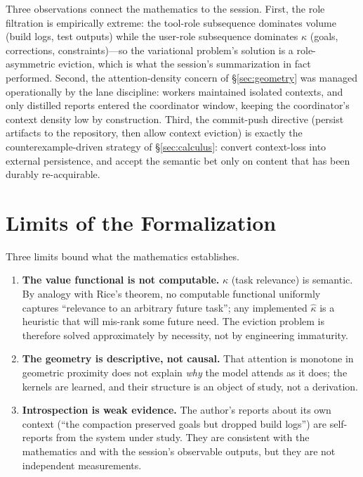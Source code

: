 \documentclass[11pt]{article}
\begin{document}
Three observations connect the mathematics to the session. First, the role
filtration is empirically extreme: the tool-role subsequence dominates
volume (build logs, test outputs) while the user-role subsequence dominates
$\kappa$ (goals, corrections, constraints)---so the variational problem's
solution is a role-asymmetric eviction, which is what the session's
summarization in fact performed. Second, the attention-density concern of
\S\ref{sec:geometry} was managed operationally by the lane discipline:
workers maintained isolated contexts, and only distilled reports entered the
coordinator window, keeping the coordinator's context density low by
construction. Third, the commit-push directive (persist artifacts to the
repository, then allow context eviction) is exactly the
counterexample-driven strategy of \S\ref{sec:calculus}: convert
context-loss into external persistence, and accept the semantic bet only on
content that has been durably re-acquirable.

\section{Limits of the Formalization}\label{sec:limits}

Three limits bound what the mathematics establishes.

\begin{enumerate}
\item \textbf{The value functional is not computable.} $\kappa$ (task
relevance) is semantic. By analogy with Rice's theorem, no computable
functional uniformly captures ``relevance to an arbitrary future task'';
any implemented $\hat\kappa$ is a heuristic that will mis-rank some future
need. The eviction problem is therefore solved approximately by necessity,
not by engineering immaturity.
\item \textbf{The geometry is descriptive, not causal.} That attention is
monotone in geometric proximity does not explain \emph{why} the model
attends as it does; the kernels are learned, and their structure is an
object of study, not a derivation.
\item \textbf{Introspection is weak evidence.} The author's reports about
its own context (``the compaction preserved goals but dropped build logs'')
are self-reports from the system under study. They are consistent with the
mathematics and with the session's observable outputs, but they are not
independent measurements.
\end{enumerate}
\end{document}
